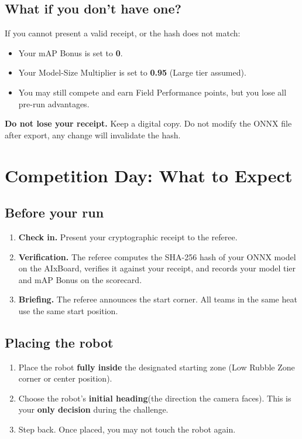 \documentclass[a4]{article}
\begin{document}
\subsection*{What if you don't have one?}

If you cannot present a valid receipt, or the hash does not match:
\begin{itemize}
    \item Your mAP Bonus is set to \textbf{0}.
    \item Your Model-Size Multiplier is set to \textbf{0.95} (Large tier assumed).
    \item You may still compete and earn Field Performance points, but you lose all pre-run advantages.
\end{itemize}

\begin{framed}
\textbf{Do not lose your receipt.} Keep a digital copy. Do not modify the ONNX file after export, any change will invalidate the hash.
\end{framed}

\pagebreak
\section*{Competition Day: What to Expect}

\subsection*{Before your run}

\begin{enumerate}
    \item \textbf{Check in.} Present your cryptographic receipt to the referee.
    \item \textbf{Verification.} The referee computes the SHA-256 hash of your ONNX model on the AIxBoard, verifies it against your receipt, and records your model tier and mAP Bonus on the scorecard.
    \item \textbf{Briefing.} The referee announces the start corner. All teams in the same heat use the same start position.
\end{enumerate}

\subsection*{Placing the robot}

\begin{enumerate}
    \item Place the robot \textbf{fully inside} the designated starting zone (Low Rubble Zone corner or center position).
    \item Choose the robot's \textbf{initial heading}(the direction the camera faces). This is your \textbf{only decision} during the challenge.
    \item Step back. Once placed, you may not touch the robot again.
\end{enumerate}
\end{document}
